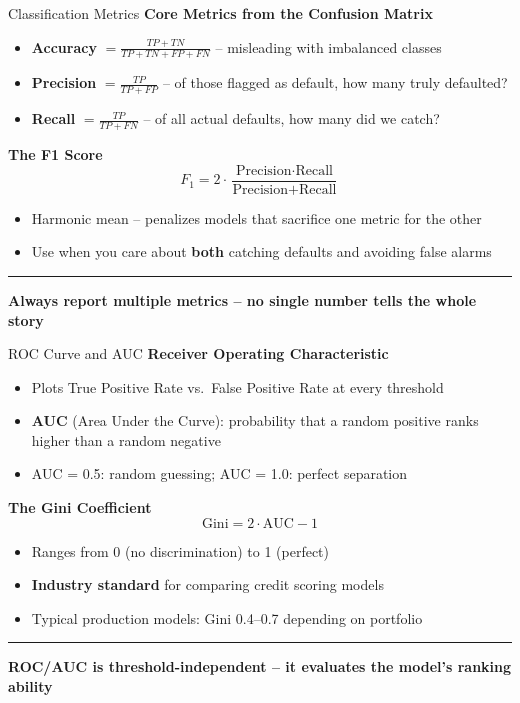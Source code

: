 \documentclass[8pt,aspectratio=169]{beamer}
\newcommand{\bottomnote}[1]{%
\vfill
\vspace{-2mm}
\textcolor{mllavender2}{\rule{\textwidth}{0.4pt}}
\vspace{1mm}
\footnotesize
\textbf{#1}
}
\begin{document}
\begin{frame}[t]{Classification Metrics}
\textbf{Core Metrics from the Confusion Matrix}
\begin{itemize}
  \item \textbf{Accuracy} $= \frac{TP + TN}{TP + TN + FP + FN}$ -- misleading with imbalanced classes
  \item \textbf{Precision} $= \frac{TP}{TP + FP}$ -- of those flagged as default, how many truly defaulted?
  \item \textbf{Recall} $= \frac{TP}{TP + FN}$ -- of all actual defaults, how many did we catch?
\end{itemize}

\vspace{0.5em}
\textbf{The F1 Score}
\begin{equation}
F_1 = 2 \cdot \frac{\text{Precision} \cdot \text{Recall}}{\text{Precision} + \text{Recall}}
\end{equation}
\begin{itemize}
  \item Harmonic mean -- penalizes models that sacrifice one metric for the other
  \item Use when you care about \textbf{both} catching defaults and avoiding false alarms
\end{itemize}
\bottomnote{Always report multiple metrics -- no single number tells the whole story}
\end{frame}

\begin{frame}[t]{ROC Curve and AUC}
\textbf{Receiver Operating Characteristic}
\begin{itemize}
  \item Plots True Positive Rate vs.\ False Positive Rate at every threshold
  \item \textbf{AUC} (Area Under the Curve): probability that a random positive ranks higher than a random negative
  \item AUC = 0.5: random guessing; AUC = 1.0: perfect separation
\end{itemize}

\vspace{0.5em}
\textbf{The Gini Coefficient}
\begin{equation}
\text{Gini} = 2 \cdot \text{AUC} - 1
\end{equation}
\begin{itemize}
  \item Ranges from 0 (no discrimination) to 1 (perfect)
  \item \textbf{Industry standard} for comparing credit scoring models
  \item Typical production models: Gini 0.4--0.7 depending on portfolio
\end{itemize}
\bottomnote{ROC/AUC is threshold-independent -- it evaluates the model's ranking ability}
\end{frame}
\end{document}
